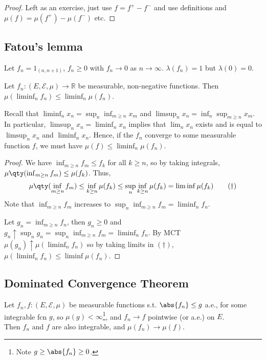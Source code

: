 \begin{proof}
	Left as an exercise, just use $f = f^+ - f^-$ and use definitions and $\mu(f) = \mu(f^+) - \mu(f^-)$ etc.
\end{proof}

\subsection{Fatou's lemma}
\begin{example}
	Let $f_n = 1_{(n, n+1)}$, $f_n \geq 0$ with $f_n \to 0$ as $n \to \infty$.
	$\lambda(f_n) = 1$ but $\lambda(0) = 0$.
\end{example}

\begin{lemma}
	Let $f_n \colon (E, \mathcal E, \mu) \to \mathbb R$ be measurable, non-negative functions.
	Then $\mu (\liminf_n f_n) \leq \liminf_n \mu(f_n)$.
\end{lemma}

\begin{remark}
	Recall that $\liminf_n x_n = \sup_n \inf_{m \geq n} x_m$ and $\limsup_n x_n = \inf_n \sup_{m \geq n} x_m$.
	In particular, $\limsup_n x_n = \liminf_n x_n$ implies that $\lim_n x_n$ exists and is equal to $\limsup_n x_n$ and $\liminf_n x_n$.
	Hence, if the $f_n$ converge to some measurable function $f$, we must have $\mu(f) \leq \liminf_n \mu(f_n)$.
\end{remark}

\begin{proof}
	We have $\inf_{m \geq n} f_m \leq f_k$ for all $k \geq n$, so by taking integrals, $\mu\qty(\inf_{m \geq n} f_m) \leq \mu(f_k)$.
	Thus,
	\begin{align*}
		\mu\qty(\inf_{m \geq n} f_m) \leq \inf_{k \geq n} \mu(f_k) \leq \sup_n \inf_{k \geq n} \mu(f_k) = \liminf \mu(f_k) \tag{$\dagger$}
	\end{align*}
	Note that $\inf_{m \geq n} f_m$ increases to $\sup_n \inf_{m \geq n} f_m = \liminf_n f_n$.

	Let $g_n = \inf_{m \geq n} f_n$, then $g_n \geq 0$ and $g_n \uparrow \sup_n g_n = \sup_n \inf_{m \geq n} f_m = \liminf_n f_n$.
	By MCT $\mu(g_n) \uparrow \mu(\liminf_n f_n)$ so by taking limits in $(\dagger)$, $\mu(\liminf_n f_n) \leq \liminf \mu(f_n)$.
\end{proof}

\subsection{Dominated Convergence Theorem}
\begin{theorem} \label{thm:dct}
	Let $f_n, f \colon (E, \mathcal E, \mu)$ be measurable functions s.t. $\abs{f_n} \leq g$ a.e., for some integrable fcn $g$, so $\mu(g) < \infty$\footnote{Note $g \geq \abs{f_n} \geq 0$.}, and $f_n \to f$ pointwise (or a.e.) on $E$. \\
	Then $f_n$ and $f$ are also integrable, and $\mu(f_n) \to \mu(f)$.
\end{theorem}

